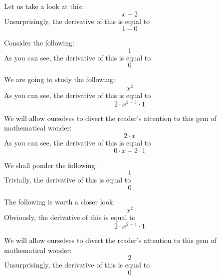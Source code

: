 \documentclass{article}
\begin{document}
Let us take a look at this:
\begin{equation}
x - 2 
\end{equation}
Unsurprisingly, the derivative of this is equal to
\begin{equation}
1 - 0 
\end{equation}

Consider the following:
\begin{equation}
1 
\end{equation}
As you can see, the derivative of this is equal to
\begin{equation}
0 
\end{equation}

We are going to study the following:
\begin{equation}
x ^{2 } 
\end{equation}
As you can see, the derivative of this is equal to
\begin{equation}
2 \cdot x ^{2 - 1 } \cdot 1 
\end{equation}

We will allow ourselves to divert the reader's attention to this gem of mathematical wonder:
\begin{equation}
2 \cdot x 
\end{equation}
As you can see, the derivative of this is equal to
\begin{equation}
0 \cdot x + 2 \cdot 1 
\end{equation}

We shall ponder the following:
\begin{equation}
1 
\end{equation}
Trivially, the derivative of this is equal to
\begin{equation}
0 
\end{equation}

The following is worth a closer look:
\begin{equation}
x ^{2 } 
\end{equation}
Obviously, the derivative of this is equal to
\begin{equation}
2 \cdot x ^{2 - 1 } \cdot 1 
\end{equation}

We will allow ourselves to divert the reader's attention to this gem of mathematical wonder:
\begin{equation}
2 
\end{equation}
Unsurprisingly, the derivative of this is equal to
\begin{equation}
0 
\end{equation}
\end{document}
